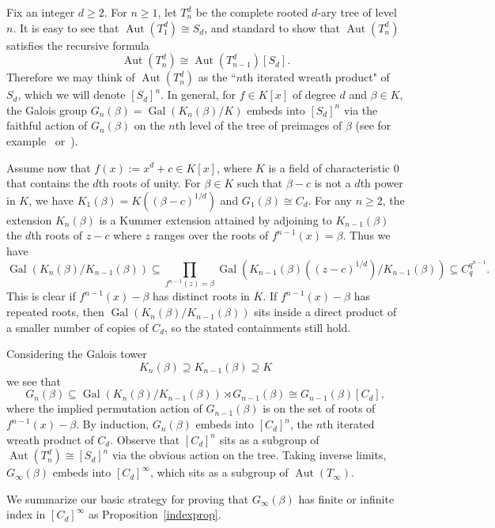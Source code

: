 \documentclass[11pt]{amsart}
\theoremstyle{definition}
\theoremstyle{definition}
\numberwithin{thm}{section}
\numberwithin{equation}{thm}
\newcommand{\Kbar}{\ensuremath {\overline K}}
\DeclareMathOperator{\Gal}{Gal}
\DeclareMathOperator{\Aut}{Aut}
\begin{document}
Fix an integer $d\geq 2$. For $n\geq 1$, let $T^d_n$ be the complete rooted $d$-ary tree of level $n$. 
It is easy to see that $\Aut(T^d_1)\cong S_d$, and standard to show that $\Aut(T^d_n)$ 
satisfies the recursive formula
\[\Aut(T^d_n)\cong \Aut(T^d_{n-1})[S_d].\]
Therefore we may think of $\Aut(T^d_n)$ as the ``$n$th iterated wreath product" of $S_d$, which we will 
denote $[S_d]^n$. In general, for $f\in K[x]$ of degree $d$ and $\beta\in K$, the Galois group $G_n(\beta)=\Gal(K_n(\beta)/K)$ 
embeds into $[S_d]^n$ via the faithful action of $G_n(\beta)$ on the $n$th level of the tree of preimages of $\beta$ 
(see for example~\cite{OdoniIterates} or~\cite[Section 2]{BT2}). 

Assume now that $f(x):=x^d+c\in K[x]$, where $K$ is a field of characteristic $0$ that contains the $d$th roots of unity. 
For $\beta\in K$ such that $\beta-c$ is not a $d$th power in $K$, 
we have $K_1(\beta)=K((\beta-c)^{1/d})$ and $G_1(\beta)\cong C_d$. For any $n\geq 2$, 
the extension $K_{n}(\beta)$ is a Kummer extension attained by adjoining to $K_{n-1}(\beta)$ the 
$d$th roots of $z-c$ where $z$ ranges over the roots of $f^{n-1}(x)=\beta$. Thus we have
\begin{equation*}
\Gal(K_n(\beta)/K_{n-1}(\beta))\subseteq \prod_{f^{n-1}(z)=\beta} \Gal(K_{n-1}(\beta)((z-c)^{1/d})/K_{n-1}(\beta))\subseteq C_q^{q^{n-1}}.
\end{equation*}
This is clear if $f^{n-1}(x)-\beta$ has distinct roots in $\Kbar$. 
If $f^{n-1}(x)-\beta$ has repeated roots, then $\Gal(K_n(\beta)/K_{n-1}(\beta))$ sits inside a direct product of a 
smaller number of copies of $C_d$, so the stated containments still hold. 

Considering the Galois tower
\[ K_n(\beta) \supseteq K_{n-1}(\beta)\supseteq K\]
we see that 
\[G_n(\beta)\subseteq \Gal(K_n(\beta)/K_{n-1}(\beta)) \rtimes G_{n-1}(\beta) \cong G_{n-1}(\beta)[C_d],\]
where the implied permutation action of $G_{n-1}(\beta)$ is on the set of roots of $f^{n-1}(x)-\beta$. By induction,
$G_n(\beta)$ embeds into $[C_d]^n$, the $n$th iterated wreath product of $C_d$. 
Observe that $[C_d]^n$ sits as a subgroup of $\Aut(T^d_n)\cong[S_d]^n$ via the obvious action on the tree. 
Taking inverse limits, $G_\infty(\beta)$ embeds into $[C_d]^\infty$, which sits as a subgroup of $\Aut(T_\infty)$. 

We summarize our basic strategy for proving that $G_\infty(\beta)$ has finite or infinite index in $[C_d]^\infty$ 
as Proposition~\ref{indexprop}.
\end{document}
